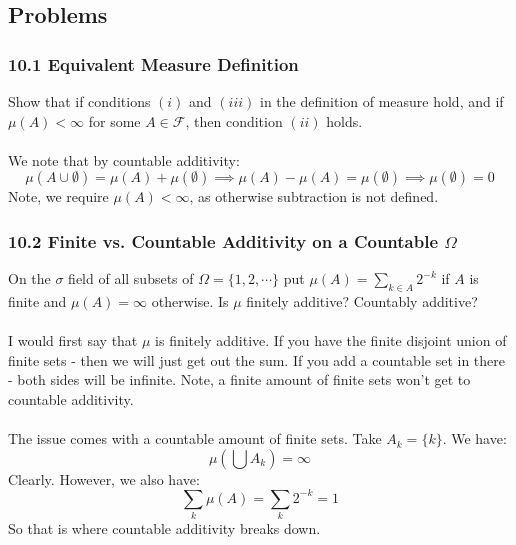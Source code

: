\documentclass[12pt,a4paper]{article}
\newcommand{\1}[1]{\mathbbm{1}\left\{ #1 \right\}}
\newcommand{\fcal}{\mathcal{F}}
\begin{document}
\subsection{Problems}
\subsubsection{10.1 Equivalent Measure Definition} Show that if conditions $(i)$ and $(iii)$ in the definition of measure hold, and if $\mu(A) < \infty$ for some $A \in \fcal$, then condition $(ii)$ holds.
\\\\
We note that by countable additivity:
$$
	\mu\left(A \cup \emptyset\right) = \mu(A) + \mu(\emptyset) \implies
	\mu(A) - \mu(A) = \mu(\emptyset) \implies \mu(\emptyset) = 0
$$
Note, we require $\mu(A) < \infty$, as otherwise subtraction is not defined.

\subsubsection{10.2 Finite vs. Countable Additivity on a Countable $\Omega$} On the $\sigma$ field of all subsets of $\Omega = \{1, 2, \cdots\}$ put $\mu(A) = \sum_{k \in A} 2^{-k}$ if $A$ is finite and $\mu(A) = \infty$ otherwise. Is $\mu$ finitely additive? Countably additive?
\\\\
I would first say that $\mu$ is finitely additive. If you have the finite disjoint union of finite sets - then we will just get out the sum. If you add a countable set in there - both sides will be infinite. Note, a finite amount of finite sets won't get to countable additivity.
\\\\
The issue comes with a countable amount of finite sets. Take $A_k = \{k\}$. We have:
$$
	\mu(\bigcup A_k) = \infty
$$
Clearly. However, we also have:
$$
	\sum_k \mu(A) = \sum_k 2^{-k} = 1
$$
So that is where countable additivity breaks down.
\end{document}
